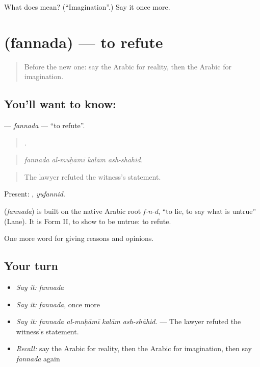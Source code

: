 \begin{tcolorbox}[breakable,colback=teal!4,colframe=teal!35!black,title={Before you move on}]
What does  mean? (\textquotedblleft{}Imagination\textquotedblright{}.) Say it once more.
\end{tcolorbox}
\section[\texorpdfstring{\ar{فند} (fannada)}{فند (fannada)}]{ (fannada) — to refute}

\label{lesson:AR-C365-fannada}



\begin{quote}
Before the new one: say the Arabic for reality, then the Arabic for imagination.
\end{quote}

\subsection*{You'll want to know: }
\textbf{} — \emph{fannada} — \textquotedblleft{}to refute\textquotedblright{}.

\begin{quote}
   .
\end{quote}

\begin{quote}
\emph{fannada al-muḥāmī kalām ash-shāhid.}
\end{quote}

\begin{quote}
The lawyer refuted the witness's statement.
\end{quote}

Present: , \emph{yufannid}.

\begin{cousinweb}
\textbf{} (\emph{fannada}) is built on the native Arabic root \emph{f-n-d}, \textquotedblleft{}to lie, to say what is untrue\textquotedblright{} (Lane). It is Form II, to show to be untrue: to refute.
\end{cousinweb}

\begin{grammarlens}[title={What you've built}]
One more word for giving reasons and opinions.
\end{grammarlens}

\subsection*{Your turn}
\begin{itemize}
\raggedright
  \item \emph{Say it:} \emph{fannada}
  \item \emph{Say it:} \emph{fannada}, once more
  \item \emph{Say it:} \emph{fannada al-muḥāmī kalām ash-shāhid.} — The lawyer refuted the witness's statement.
  \item \emph{Recall:} say the Arabic for reality, then the Arabic for imagination, then say \emph{fannada} again
\end{itemize}

